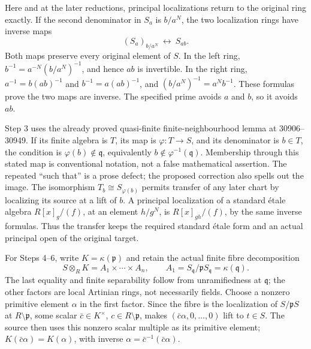 Here and at the later reductions, principal localizations return to the original ring exactly. If the second denominator in \(S_a\) is \(b/a^N\), the two localization rings have inverse maps \[
(S_a)_{b/a^N}\ \longleftrightarrow\ S_{ab}.
\] Both maps preserve every original element of \(S\). In the left ring, \(b^{-1}=a^{-N}(b/a^N)^{-1}\), and hence \(ab\) is invertible. In the right ring, \(a^{-1}=b(ab)^{-1}\) and \(b^{-1}=a(ab)^{-1}\), and \((b/a^N)^{-1}=a^Nb^{-1}\). These formulas prove the two maps are inverse. The specified prime avoids \(a\) and \(b\), so it avoids \(ab\).

Step 3 uses the already proved quasi-finite finite-neighbourhood lemma at 30906--30949. If its finite algebra is \(T\), its map is \(\varphi:T\to S\), and its denominator is \(b\in T\), the condition is \(\varphi(b)\notin\mathfrak q\), equivalently \(b\notin\varphi^{-1}(\mathfrak q)\). Membership through this stated map is conventional notation, not a false mathematical assertion. The repeated ``such that'' is a prose defect; the proposed correction also spells out the image. The isomorphism \(T_b\cong S_{\varphi(b)}\) permits transfer of any later chart by localizing its source at a lift of \(b\). A principal localization of a standard étale algebra \(R[x]_g/(f)\), at an element \(h/g^N\), is \(R[x]_{gh}/(f)\), by the same inverse formulas. Thus the transfer keeps the required standard étale form and an actual principal open of the original target.

For Steps 4--6, write \(K=\kappa(\mathfrak p)\) and retain the actual finite fibre decomposition \[
S\otimes_R K=A_1\times\cdots\times A_n,\qquad
A_1=S_{\mathfrak q}/\mathfrak pS_{\mathfrak q}
    =\kappa(\mathfrak q).
\] The last equality and finite separability follow from unramifiedness at \(\mathfrak q\); the other factors are local Artinian rings, not necessarily fields. Choose a nonzero primitive element \(\alpha\) in the first factor. Since the fibre is the localization of \(S/\mathfrak pS\) at \(R\setminus\mathfrak p\), some scalar \(\bar c\in K^\times\), \(c\in R\setminus\mathfrak p\), makes \((\bar c\alpha,0,\ldots,0)\) lift to \(t\in S\). The source then uses this nonzero scalar multiple as its primitive element; \(K(\bar c\alpha)=K(\alpha)\), with inverse \(\alpha=\bar c^{-1}(\bar c\alpha)\).

